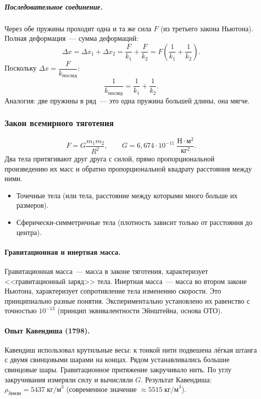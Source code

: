 \documentclass[12pt]{article}
\begin{document}
\subparagraph{Последовательное соединение.}
Через обе пружины проходит одна и та же сила $F$ (из третьего закона Ньютона). Полная деформация~--- сумма деформаций:
\[
	\Delta x = \Delta x_1 + \Delta x_2 = \frac{F}{k_1} + \frac{F}{k_2} = F\left(\frac{1}{k_1} + \frac{1}{k_2}\right).
\]
Поскольку $\Delta x = \dfrac{F}{k_{\text{послед}}}$:
\[
	\boxed{\frac{1}{k_{\text{послед}}} = \frac{1}{k_1} + \frac{1}{k_2}.}
\]
Аналогия: две пружины в ряд~--- это одна пружина большей длины, она мягче.

\subsubsection{Закон всемирного тяготения}

\begin{law}
	\[
		F = G \frac{m_1 m_2}{R^2}, \qquad G = 6{,}674 \cdot 10^{-11} \; \frac{\text{Н}\cdot\text{м}^2}{\text{кг}^2}.
	\]
	Два тела притягивают друг друга с силой, прямо пропорциональной произведению их масс и обратно пропорциональной квадрату расстояния между ними.
\end{law}

\begin{statement}
	\begin{itemize}
		\item Точечные тела (или тела, расстояние между которыми много больше их размеров).
		\item Сферически-симметричные тела (плотность зависит только от расстояния до центра).
	\end{itemize}
\end{statement}

\paragraph{Гравитационная и инертная масса.}
Гравитационная масса~--- масса в законе тяготения, характеризует <<гравитационный заряд>> тела. Инертная масса~--- масса во втором законе Ньютона, характеризует сопротивление тела изменению скорости. Это принципиально разные понятия. Экспериментально установлено их равенство с точностью $10^{-13}$ (принцип эквивалентности Эйнштейна, основа ОТО).

\paragraph{Опыт Кавендиша (1798).}
Кавендиш использовал крутильные весы: к тонкой нити подвешена лёгкая штанга с двумя свинцовыми шарами на концах. Рядом устанавливались большие свинцовые шары. Гравитационное притяжение закручивало нить. По углу закручивания измеряли силу и вычисляли $G$. Результат Кавендиша: $\rho_{\text{Земли}} = 5437 \; \text{кг/м}^3$ (современное значение $\approx 5515 \; \text{кг/м}^3$).
\end{document}
